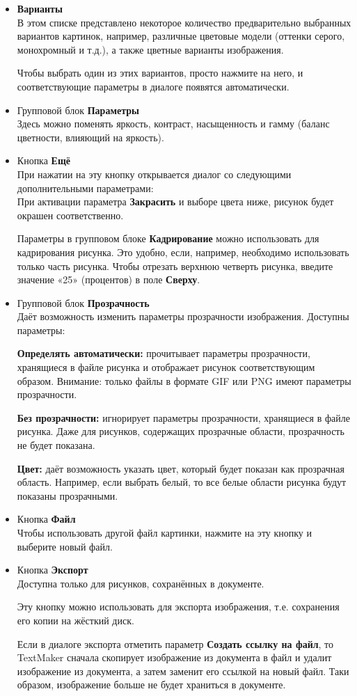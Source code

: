 ﻿\documentclass[a4paper,10pt]{article}
\begin{document}
\begin{itemize}
 \item \textbf{Варианты}\\
 В этом списке представлено некоторое количество предварительно выбранных вариантов картинок, например, различные цветовые модели (оттенки серого, монохромный и т.д.), а также цветные варианты изображения.
 
 Чтобы выбрать один из этих вариантов, просто нажмите на него, и соответствующие параметры в диалоге появятся автоматически.
 \item Групповой блок \textbf{Параметры}\\
 Здесь можно поменять яркость, контраст, насыщенность и гамму (баланс цветности, влияющий на яркость).
 \item Кнопка \textbf{Ещё}\\
 При нажатии на эту кнопку открывается диалог со следующими дополнительными параметрами:\\
При активации параметра \textbf{Закрасить} и выборе цвета ниже, рисунок будет окрашен соответственно.

Параметры в групповом блоке \textbf{Кадрирование} можно использовать для кадрирования рисунка. Это удобно, если, например, необходимо использовать только часть рисунка. Чтобы отрезать верхнюю четверть рисунка, введите значение «25» (процентов) в поле \textbf{Сверху}.
\item Групповой блок \textbf{Прозрачность}\\
Даёт возможность изменить параметры прозрачности изображения. Доступны параметры:

\textbf{Определять автоматически:} прочитывает параметры прозрачности, хранящиеся в файле рисунка и отображает рисунок соответствующим образом. Внимание: только файлы в формате GIF или PNG имеют параметры прозрачности.

\textbf{Без прозрачности:} игнорирует параметры прозрачности, хранящиеся в файле рисунка. Даже для рисунков, содержащих прозрачные области, прозрачность не будет показана.

\textbf{Цвет:} даёт возможность указать цвет, который будет показан как прозрачная область. Например, если выбрать белый, то все белые области рисунка будут показаны прозрачными.
\item Кнопка \textbf{Файл}\\
Чтобы использовать другой файл картинки, нажмите на эту кнопку и выберите новый файл.
\item Кнопка \textbf{Экспорт}\\
Доступна только для рисунков, сохранённых в документе.

Эту кнопку можно использовать для экспорта изображения, т.е. сохранения его копии на жёсткий диск.

Если в диалоге экспорта отметить параметр \textbf{Создать ссылку на файл}, то TextMaker сначала скопирует изображение из документа в файл и удалит изображение из документа, а затем заменит его ссылкой на новый файл. Таки образом, изображение больше не будет храниться в документе.
\end{itemize}
\end{document}
